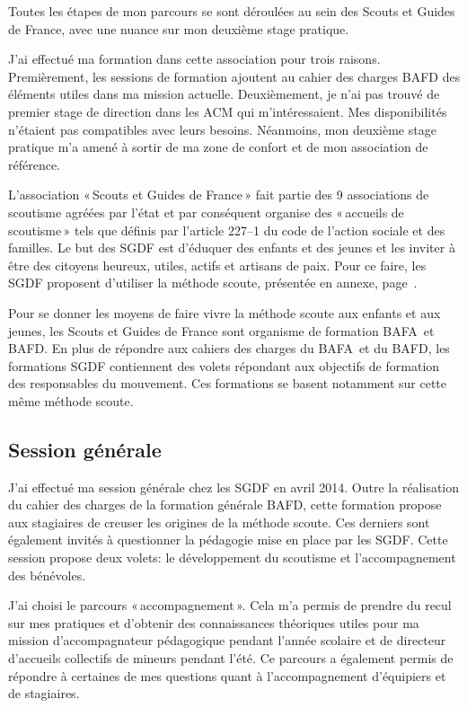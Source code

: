 \documentclass[titlepage,11pt,a4paper]{article}
\begin{document}
Toutes les étapes de mon parcours se sont déroulées au sein des Scouts et Guides de
France, avec une nuance sur mon deuxième stage pratique.

J'ai effectué ma formation dans cette association pour trois raisons. Premièrement,
les sessions de formation ajoutent au cahier des charges BAFD des éléments utiles dans ma
mission actuelle. Deuxièmement, je n'ai pas trouvé de premier stage de direction dans les ACM qui
m'intéressaient. Mes disponibilités n'étaient pas compatibles avec leurs besoins. Néanmoins,
mon deuxième stage pratique m'a amené à sortir de ma zone de confort et de mon association
de référence.

L'association «\,Scouts et Guides de France\,» fait partie des 9 associations de scoutisme agréées par
l'état et par conséquent organise des «\,accueils de scoutisme\,» tels que définis par
l'article 227--1 du code de l'action sociale et des familles. Le but des SGDF est d'éduquer
des enfants et des jeunes et les inviter à être des citoyens heureux, utiles, actifs et artisans
de paix. Pour ce faire, les SGDF proposent d'utiliser la méthode scoute, présentée en
annexe, page~\pageref{methsc}.

Pour se donner les moyens de faire vivre la méthode scoute aux enfants et aux jeunes, les
Scouts et Guides de France sont organisme de formation BAFA et BAFD\@. En plus de répondre aux cahiers des
charges du BAFA et du BAFD, les formations SGDF contiennent des volets répondant aux objectifs
de formation des responsables du mouvement. Ces formations se basent notamment sur cette même méthode scoute.

\subsection{Session générale}

J'ai effectué ma session générale chez les SGDF en avril 2014.
Outre la réalisation du cahier des charges de la formation générale BAFD,
cette formation propose aux stagiaires de creuser les origines de la méthode scoute. Ces
derniers sont également invités à questionner la pédagogie mise en place par les SGDF\@.
Cette session propose deux volets: le développement du scoutisme et l'accompagnement des bénévoles.

J'ai choisi le parcours «\,accompagnement\,». Cela m'a permis de prendre du recul sur mes
pratiques et d'obtenir des connaissances théoriques utiles pour ma mission
d’accompagnateur pédagogique pendant l'année scolaire et de directeur d’accueils
collectifs de mineurs pendant l'été. Ce parcours a également permis de répondre à
certaines de mes questions quant à l'accompagnement d'équipiers et de stagiaires.
\end{document}
